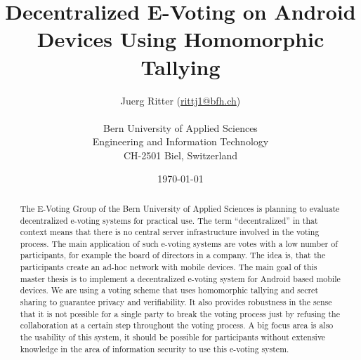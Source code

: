 \documentclass[numbers=noenddot, abstract=on, a4paper, headsepline,
footsepline, oneside, draft=off]{scrreprt}
\begin{document}
\title{\bf Decentralized E-Voting on Android Devices Using Homomorphic Tallying}
\subject{Master Thesis}
\author{Juerg Ritter (\url{rittj1@bfh.ch})\\
\\
Bern University of Applied Sciences\\
Engineering and Information Technology\\
CH-2501 Biel, Switzerland\\
}
\date{\today}
\publishers{Advisor:\\
Prof. Dr. Rolf Haenni, Bern University of Applied Sciences\\
\bigskip
Expert:\\
Stephan Neumann, Technical University of Darmstadt}
\maketitle

\makenomenclature

\clearpage
{}

\begin{abstract}
The E-Voting Group of the Bern University of Applied Sciences is planning to
evaluate decentralized e-voting systems for practical use. The term
``decentralized'' in that context means that there is no central server
infrastructure involved in the voting process. The main application of such
e-voting systems are votes with a low number of participants, for example the
board of directors in a company. The idea is, that the participants create an
ad-hoc network with mobile devices. The main goal of this master thesis is to
implement a decentralized e-voting system for Android based mobile devices. We
are using a voting scheme that uses homomorphic tallying and secret sharing to
guarantee privacy and verifiability. It also provides robustness in the sense
that it is not possible for a single party to break the voting process just by
refusing the collaboration at a certain step throughout the voting process. A
big focus area is also the usability of this system, it should be possible for
participants without extensive knowledge in the area of information security to
use this e-voting system.
\end{abstract}

\tableofcontents
\listoffigures
\listoftables

\end{document}
